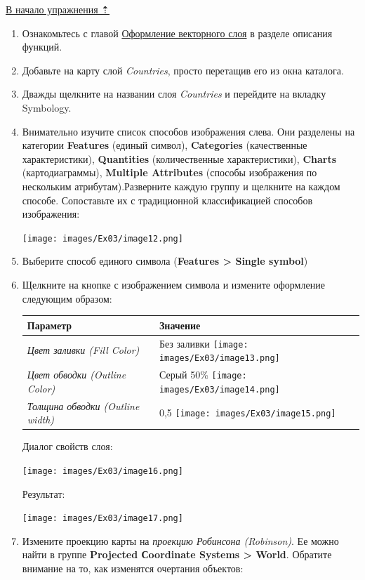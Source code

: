 \documentclass[12pt,]{book}
\begin{document}
\protect\hyperlink{map-design-climates}{В начало упражнения ⇡}

\begin{enumerate}
\def\labelenumi{\arabic{enumi}.}
\item
  Ознакомьтесь с главой \protect\hyperlink{manual-vector}{Оформление векторного слоя} в разделе описания функций.
\item
  Добавьте на карту слой \emph{Countries}, просто перетащив его из окна каталога.
\item
  Дважды щелкните на названии слоя \emph{Countries} и перейдите на вкладку Symbology.
\item
  Внимательно изучите список способов изображения слева. Они разделены на категории \textbf{Features} (единый символ), \textbf{Categories} (качественные характеристики), \textbf{Quantities} (количественные характеристики), \textbf{Charts} (картодиаграммы), \textbf{Multiple Attributes} (способы изображения по нескольким атрибутам).Разверните каждую группу и щелкните на каждом способе. Сопоставьте их с традиционной классификацией способов изображения:

  \texttt{[image: images/Ex03/image12.png]}
\item
  Выберите способ единого символа (\textbf{Features \textgreater{} Single symbol})
\item
  Щелкните на кнопке с изображением символа и измените оформление следующим образом:

  \begin{longtable}[]{@{}ll@{}}
  \toprule
  \textbf{Параметр} & \textbf{Значение}\tabularnewline
  \midrule
  \endhead
  \emph{Цвет заливки (Fill Color)} & Без заливки \texttt{[image: images/Ex03/image13.png]}\tabularnewline
  \emph{Цвет обводки (Outline Color)} & Серый 50\% \texttt{[image: images/Ex03/image14.png]}\tabularnewline
  \emph{Толщина обводки (Outline width)} & 0,5 \texttt{[image: images/Ex03/image15.png]}\tabularnewline
  \bottomrule
  \end{longtable}

  Диалог свойств слоя:

  \texttt{[image: images/Ex03/image16.png]}

  Результат:

  \texttt{[image: images/Ex03/image17.png]}
\item
  Измените проекцию карты на \emph{проекцию Робинсона (Robinson)}. Ее можно найти в группе \textbf{Projected Сoordinate Systems \textgreater{} World}. Обратите внимание на то, как изменятся очертания объектов:


\end{enumerate}
\end{document}
